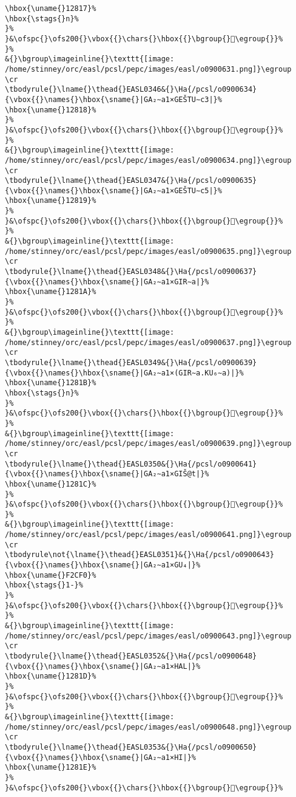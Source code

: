\begin{verbatim}
\hbox{\uname{}12817}%
\hbox{\stags{}n}%
}%
}&\ofspc{}\ofs200{}\vbox{{}\chars{}\hbox{{}\bgroup{}𒠗\egroup{}}%
}%
&{}\bgroup\imageinline{}\texttt{[image: /home/stinney/orc/easl/pcsl/pepc/images/easl/o0900631.png]}\egroup
\cr
\tbodyrule{}\lname{}\thead{}EASL0346&{}\Ha{/pcsl/o0900634}{\vbox{{}\names{}\hbox{\sname{}|GA₂∼a1×GEŠTU∼c3|}%
\hbox{\uname{}12818}%
}%
}&\ofspc{}\ofs200{}\vbox{{}\chars{}\hbox{{}\bgroup{}𒠘\egroup{}}%
}%
&{}\bgroup\imageinline{}\texttt{[image: /home/stinney/orc/easl/pcsl/pepc/images/easl/o0900634.png]}\egroup
\cr
\tbodyrule{}\lname{}\thead{}EASL0347&{}\Ha{/pcsl/o0900635}{\vbox{{}\names{}\hbox{\sname{}|GA₂∼a1×GEŠTU∼c5|}%
\hbox{\uname{}12819}%
}%
}&\ofspc{}\ofs200{}\vbox{{}\chars{}\hbox{{}\bgroup{}𒠙\egroup{}}%
}%
&{}\bgroup\imageinline{}\texttt{[image: /home/stinney/orc/easl/pcsl/pepc/images/easl/o0900635.png]}\egroup
\cr
\tbodyrule{}\lname{}\thead{}EASL0348&{}\Ha{/pcsl/o0900637}{\vbox{{}\names{}\hbox{\sname{}|GA₂∼a1×GIR∼a|}%
\hbox{\uname{}1281A}%
}%
}&\ofspc{}\ofs200{}\vbox{{}\chars{}\hbox{{}\bgroup{}𒠚\egroup{}}%
}%
&{}\bgroup\imageinline{}\texttt{[image: /home/stinney/orc/easl/pcsl/pepc/images/easl/o0900637.png]}\egroup
\cr
\tbodyrule{}\lname{}\thead{}EASL0349&{}\Ha{/pcsl/o0900639}{\vbox{{}\names{}\hbox{\sname{}|GA₂∼a1×(GIR∼a.KU₆∼a)|}%
\hbox{\uname{}1281B}%
\hbox{\stags{}n}%
}%
}&\ofspc{}\ofs200{}\vbox{{}\chars{}\hbox{{}\bgroup{}𒠛\egroup{}}%
}%
&{}\bgroup\imageinline{}\texttt{[image: /home/stinney/orc/easl/pcsl/pepc/images/easl/o0900639.png]}\egroup
\cr
\tbodyrule{}\lname{}\thead{}EASL0350&{}\Ha{/pcsl/o0900641}{\vbox{{}\names{}\hbox{\sname{}|GA₂∼a1×GIŠ@t|}%
\hbox{\uname{}1281C}%
}%
}&\ofspc{}\ofs200{}\vbox{{}\chars{}\hbox{{}\bgroup{}𒠜\egroup{}}%
}%
&{}\bgroup\imageinline{}\texttt{[image: /home/stinney/orc/easl/pcsl/pepc/images/easl/o0900641.png]}\egroup
\cr
\tbodyrule\not{\lname{}\thead{}EASL0351}&{}\Ha{/pcsl/o0900643}{\vbox{{}\names{}\hbox{\sname{}|GA₂∼a1×GU₄|}%
\hbox{\uname{}F2CF0}%
\hbox{\stags{}1-}%
}%
}&\ofspc{}\ofs200{}\vbox{{}\chars{}\hbox{{}\bgroup{}󲳰\egroup{}}%
}%
&{}\bgroup\imageinline{}\texttt{[image: /home/stinney/orc/easl/pcsl/pepc/images/easl/o0900643.png]}\egroup
\cr
\tbodyrule{}\lname{}\thead{}EASL0352&{}\Ha{/pcsl/o0900648}{\vbox{{}\names{}\hbox{\sname{}|GA₂∼a1×HAL|}%
\hbox{\uname{}1281D}%
}%
}&\ofspc{}\ofs200{}\vbox{{}\chars{}\hbox{{}\bgroup{}𒠝\egroup{}}%
}%
&{}\bgroup\imageinline{}\texttt{[image: /home/stinney/orc/easl/pcsl/pepc/images/easl/o0900648.png]}\egroup
\cr
\tbodyrule{}\lname{}\thead{}EASL0353&{}\Ha{/pcsl/o0900650}{\vbox{{}\names{}\hbox{\sname{}|GA₂∼a1×HI|}%
\hbox{\uname{}1281E}%
}%
}&\ofspc{}\ofs200{}\vbox{{}\chars{}\hbox{{}\bgroup{}𒠞\egroup{}}%

\end{verbatim}
